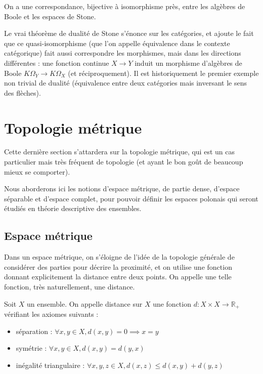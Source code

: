 \begin{theorem}
  On a une correspondance, bijective à isomorphisme près, entre les algèbres
  de Boole et les espaces de Stone.
\end{theorem}

Le vrai théorème de dualité de Stone s'énonce sur les catégories, et ajoute le
fait que ce quasi-isomorphisme (que l'on appelle équivalence dans le contexte
catégorique) fait aussi correspondre les morphismes, mais dans les directions
différentes : une fonction continue $X \to Y$ induit un morphisme d'algèbres de
Boole $K\Omega_Y\to K\Omega_X$ (et réciproquement). Il est historiquement le
premier exemple non trivial de dualité (équivalence entre deux catégories mais
inversant le sens des flèches).

\section{Topologie métrique}

Cette dernière section s'attardera sur la topologie métrique, qui est un cas
particulier mais très fréquent de topologie (et ayant le bon goût de beaucoup
mieux se comporter).

Nous aborderons ici les notions d'espace métrique, de partie dense, d'espace
séparable et d'espace complet, pour pouvoir définir les espaces polonais qui
seront étudiés en théorie descriptive des ensembles.

\subsection{Espace métrique}

Dans un espace métrique, on s'éloigne de l'idée de la topologie générale de
considérer des parties pour décrire la proximité, et on utilise une fonction
donnant explicitement la distance entre deux points. On appelle une telle
fonction, très naturellement, une distance.

\begin{definition}[Distance]
  Soit $X$ un ensemble. On appelle distance sur $X$ une fonction
  $d : X \times X \to \mathbb R_+$ vérifiant les axiomes suivants :
  \begin{itemize}
  \item séparation : $\forall x,y\in X, d(x,y) =0 \implies x = y$
  \item symétrie : $\forall x,y\in X, d(x,y)=d(y,x)$
  \item inégalité triangulaire :
    $\forall x,y,z\in X, d(x,z) \leq d(x,y)+d(y,z)$
  \end{itemize}
\end{definition}

